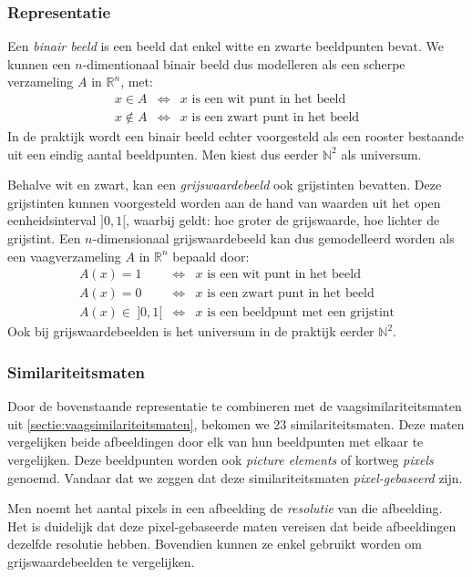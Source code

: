 \subsubsection{Representatie}

Een \emph{binair beeld} is een beeld dat enkel witte en zwarte beeldpunten bevat. We kunnen een 
$n$-dimentionaal binair beeld dus modelleren als een scherpe verzameling $A$ in $\mathbb{R}^n$, met:
$$
\begin{array}{rcl}
x \in A & \iff & x \textrm{ is een wit punt in het beeld} \\
x \notin A & \iff & x \textrm{ is een zwart punt in het beeld}
\end{array}
$$ 
In de praktijk wordt een binair beeld echter voorgesteld als een rooster bestaande uit een
eindig aantal beeldpunten. Men kiest dus eerder $\mathbb{N}^2$ als universum.

Behalve wit en zwart, kan een \emph{grijswaardebeeld} ook grijstinten bevatten. Deze grijstinten
kunnen voorgesteld worden aan de hand van waarden uit het open eenheidsinterval $]0,1[$, waarbij
geldt: hoe groter de grijswaarde, hoe lichter de grijstint. Een $n$-dimensionaal grijswaardebeeld
kan dus gemodelleerd worden als een vaagverzameling $A$ in $\mathbb{R}^n$ bepaald door:
$$
\begin{array}{rcl}
A(x) = 1 & \iff & x \textrm{ is een wit punt in het beeld} \\
A(x) = 0 & \iff & x \textrm{ is een zwart punt in het beeld} \\
A(x) \in\ ]0,1[ & \iff & x \textrm{ is een beeldpunt met een grijstint}
\end{array}
$$
Ook bij grijswaardebeelden is het universum in de praktijk eerder $\mathbb{N}^2$.

\subsubsection{Similariteitsmaten}

Door de bovenstaande representatie te combineren met de vaagsimilariteitsmaten uit 
\ref{sectie:vaagsimilariteitsmaten}, bekomen we 23 similariteitsmaten. Deze maten
vergelijken beide afbeeldingen door elk van hun beeldpunten met elkaar te vergelijken.
Deze beeldpunten worden ook \emph{picture elements} of kortweg \emph{pixels} genoemd. Vandaar
dat we zeggen dat deze similariteitsmaten \emph{pixel-gebaseerd} zijn.

Men noemt het aantal pixels in een afbeelding de \emph{resolutie} van die afbeelding. Het is
duidelijk dat deze pixel-gebaseerde maten vereisen dat beide afbeeldingen dezelfde resolutie 
hebben. Bovendien kunnen ze enkel gebruikt worden om grijswaardebeelden te vergelijken.


